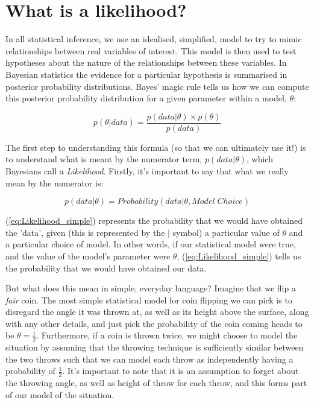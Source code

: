 \documentclass[11pt,fullpage]{book}
\begin{document}
\section{What is a likelihood?}
In all statistical inference, we use an idealised, simplified, model to try to mimic relationships between real variables of interest. This model is then used to test hypotheses about the nature of the relationships between these variables. In Bayesian statistics the evidence for a particular hypothesis is summarised in posterior probability distributions. Bayes' magic rule tells us how we can compute this posterior probability distribution for a given parameter within a model, $\theta$:

\begin{equation}
p(\theta|data) = \frac{p(data|\theta)\times p(\theta)}{p(data)}
\end{equation}\label{eq:Likelihood_Bayes}

The first step to understanding this formula (so that we can ultimately use it!) is to understand what is meant by the numerator term, $p(data|\theta)$, which Bayesians call a \textit{Likelihood}. Firstly, it's important to say that what we really mean by the numerator is:

\begin{equation}
p(data|\theta) = Probability(data|\theta,Model \; Choice)
\end{equation}\label{eq:Likelihood_simple}

(\ref{eq:Likelihood_simple}) represents the probability that we would have obtained the 'data', given (this is represented by the $|$ symbol) a particular value of $\theta$ and a particular choice of model. In other words, if our statistical model were true, and the value of the model's parameter were $\theta$, (\ref{eq:Likelihood_simple}) tells us the probability that we would have obtained our data. 

But what does this mean in simple, everyday language? Imagine that we flip a \textit{fair} coin. The most simple statistical model for coin flipping we can pick is to disregard the angle it was thrown at, as well as its height above the surface, along with any other details, and just pick the probability of the coin coming heads to be $\theta=\frac{1}{2}$. Furthermore, if a coin is thrown twice, we might choose to model the situation by assuming that the throwing technique is sufficiently similar between the two throws such that we can model each throw as independently having a probability of $\frac{1}{2}$. It's important to note that it is an assumption to forget about the throwing angle, as well as height of throw for each throw, and this forms part of our model of the situation. 
\end{document}
